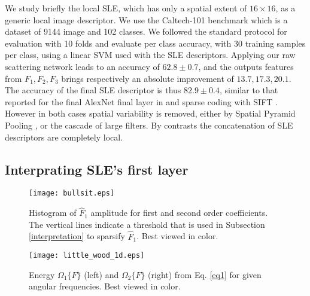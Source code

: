 \documentclass[10pt,twocolumn,letterpaper]{article}
\begin{document}
We study briefly the local SLE, which has only a spatial extent of $16 \times 16$, as a generic local image descriptor. We use the Caltech-101 benchmark which is a dataset of 9144 image and 102 classes. We followed the standard protocol for evaluation \cite{boureau2011ask} with 10 folds and evaluate per class accuracy, with 30 training samples per class, using a linear SVM used with the SLE descriptors. Applying our raw scattering network leads to an accuracy of $62.8\pm0.7$, and the outputs features from $F_1,F_2,F_3$ brings respectively an absolute improvement of $13.7,17.3,20.1$. The accuracy of the final SLE descriptor is thus  $82.9\pm0.4$, similar to that reported for the final AlexNet final layer in \cite{zeiler2014visualizing} and sparse coding with SIFT \cite{boureau2011ask}. However in both cases spatial variability is removed, either by Spatial Pyramid Pooling \cite{lazebnik2006beyond}, or the cascade of large filters. By contrasts  the concatenation of SLE descriptors are completely local.









 \subsection{Interprating SLE's first layer}
\label{sec:sle_first_sec}
\label{interpretation}




\begin{figure}
\begin{center}
\texttt{[image: bullsit.eps]} 
\end{center}
   \caption{Histogram of  $\hat F_1$ amplitude for first and second order coefficients. The vertical lines indicate a threshold that is used in Subsection \ref{interpretation} to sparsify $\hat F_1$. Best viewed in color.}
\label{fig:histo}
\end{figure}


\begin{figure}
\begin{center}
\texttt{[image: little\_wood\_1d.eps]} 
\end{center}
   \caption{Energy $\Omega_1\{F\}$  (left)  and $\Omega_2\{F\}$ (right) from Eq. \ref{eq1} for given angular frequencies. Best viewed in color.}
\label{fig:littlehood1}
\end{figure}
\end{document}
